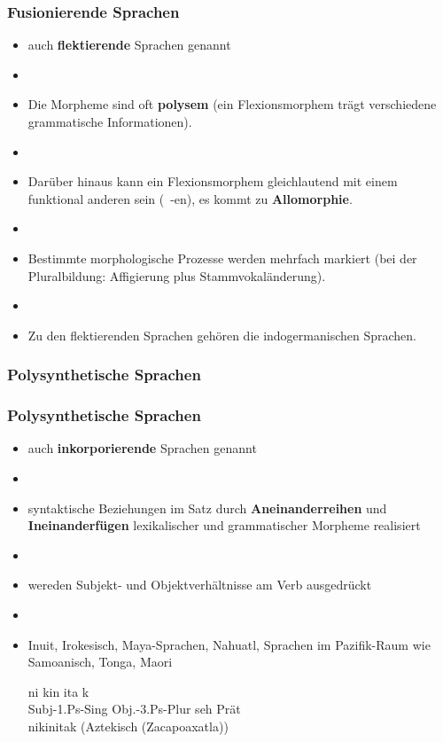 \begin{frame}
\frametitle{Fusionierende Sprachen}

\begin{itemize}
	\item auch \textbf{flektierende} Sprachen genannt
	\item[]
	\item Die Morpheme sind oft \textbf{polysem} (ein Flexionsmorphem trägt verschiedene grammatische Informationen).
	\item[]
	\item Darüber hinaus kann ein Flexionsmorphem gleichlautend mit einem funktional anderen sein (\zB\ -en), \dash es kommt zu \textbf{Allomorphie}.
	\item[]
	\item Bestimmte morphologische Prozesse werden mehrfach markiert (\zB bei der Pluralbildung: Affigierung plus Stammvokaländerung).
	\item[]
	\item Zu den flektierenden Sprachen gehören die indogermanischen Sprachen.
\end{itemize}


\end{frame}


\subsubsection{Polysynthetische Sprachen}


\begin{frame}
\frametitle{Polysynthetische Sprachen}

\begin{itemize}
	\item auch \textbf{inkorporierende} Sprachen genannt
	\item[]
	\item syntaktische Beziehungen im Satz durch \textbf{Aneinanderreihen} und \textbf{Ineinanderfügen} lexikalischer und grammatischer Morpheme realisiert
	\item[]
	\item \zB wereden Subjekt- und Objektverhältnisse am Verb ausgedrückt
	\item[]
	\item Inuit, Irokesisch, Maya-Sprachen, Nahuatl, Sprachen im Pazifik-Raum wie Samoanisch, Tonga, Maori
	
	\ea
	\glll	ni kin ita k \\
			{Subj-1.Ps-Sing} {Obj.-3.Ps-Plur} seh Prät \\
			{nikinitak (Aztekisch (Zacapoaxatla))} \\
	\z
	
\end{itemize}


\end{frame}


